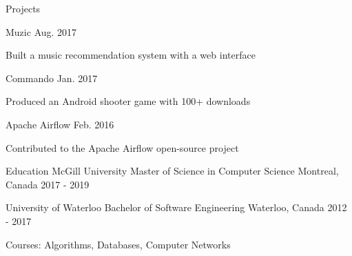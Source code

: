 \documentclass[12pt]{simple-resume}
\begin{document}
%
\begin{rSection}{Projects}%
\begin{entry}
      {Muzic}
      {}
      {Aug. 2017}
      {}%
    \begin{entryItems}
        \item {Built a music recommendation system with a web interface}
    \end{entryItems}
\end{entry}
%
\begin{entry}
      {Commando}
      {}
      {}
      {Jan. 2017}%
    \begin{entryItems}
        \item {Produced an Android shooter game with 100+ downloads}
    \end{entryItems}
\end{entry}
%
\begin{entry}
    {Apache Airflow}
    {} 
    {}
    {Feb. 2016}%
    \begin{entryItems}%
        \item {Contributed to the Apache Airflow open-source project}
    \end{entryItems}
\end{entry}
\end{rSection}
%
\begin{rSection}{Education}%
\education
    {McGill University}
    {Master of Science in Computer Science}
    {Montreal, Canada}
    {2017 - 2019}
    {}

\education
    {University of Waterloo}
    {Bachelor of Software Engineering}
    {Waterloo, Canada}
    {2012 - 2017}
    {\begin{entryItems}%
        \item Courses: Algorithms, Databases, Computer Networks
    \end{entryItems}}
\end{rSection}
\end{document}
